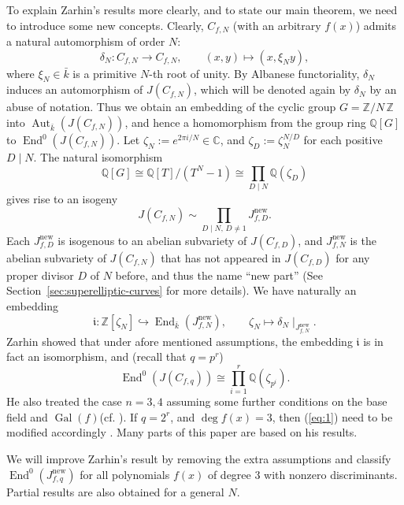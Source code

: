 \documentclass{amsart}[11pt]
\theoremstyle{definition}
\numberwithin{equation}{section}
\theoremstyle{notitle}
\begin{document}
To explain Zarhin's results more clearly, and to state our main
theorem, we need to introduce some new concepts.  Clearly, $C_{f,N}$
(with an arbitrary $f(x)$) admits a natural automorphism of order $N$:
\[ \delta_N: C_{f,N}\to C_{f,N}, \qquad (x,y)\mapsto (x,\xi_N y),\]
where $\xi_N\in \bar{k}$ is a primitive $N$-th root of unity. By
Albanese functoriality, $\delta_N$ induces an automorphism of
$J(C_{f,N})$, which will be denoted again by $\delta_N$ by an abuse of
notation.  Thus we obtain an embedding of the cyclic group
$G={\mathbb{Z}/ {N}\, \mathbb{Z}}$ into $\operatorname{Aut}_{\bar{k}}(J(C_{f,N}))$, and hence a
homomorphism from the group ring ${\mathbb{Q}}[G]$ to $\operatorname{End}^0(J(C_{f,N}))$. Let
$\zeta_N:=e^{2\pi i/N}\in {\mathbb{C}}$, and $\zeta_D:=\zeta_N^{N/D}$ for each
positive $D\mid N$. The natural isomorphism
\[ {\mathbb{Q}}[G]\cong {\mathbb{Q}}[T]/(T^N-1)\cong \prod_{D\mid N} {\mathbb{Q}}(\zeta_D)\]
gives rise to an isogeny
\begin{equation}
  \label{eq:11}
  J(C_{f,N})\sim \prod_{D\mid N,\, D\neq 1} J_{f, D}^{\mathrm{new}}. 
\end{equation}
Each $J_{f,D}^{\mathrm{new}}$ is isogenous to an abelian subvariety of
$J(C_{f,D})$, and $J_{f,N}^{\mathrm{new}}$ is the abelian subvariety of
$J(C_{f,N})$ that has not appeared in $J(C_{f,D})$ for any proper
divisor $D$ of $N$ before, and thus the name ``new part'' (See
Section~\ref{sec:superelliptic-curves} for more details). We have
naturally an embedding \[{\mathfrak{i}}:
{\mathbb{Z}}[\zeta_N]\hookrightarrow \operatorname{End}_{\bar{k}}( J_{f,N}^{\mathrm{new}}), \qquad
\zeta_N \mapsto \delta_N\mid_{J_{f,N}^{\mathrm{new}}}.\] Zarhin showed that under
afore mentioned assumptions, the embedding ${\mathfrak{i}}$ is in fact an
isomorphism, and (recall that $q=p^r$)
\begin{equation}
 \label{eq:1}
   \operatorname{End}^0(J(C_{f,q}))\cong \prod_{i=1}^r {\mathbb{Q}}(\zeta_{p^i}).    
\end{equation}
He also treated the case $n=3, 4$ assuming some further conditions on
the base field and $\operatorname{Gal}(f)$(cf. \cite[Theorem 1.3]{MR2349666}). If
$q=2^r$, and $\deg f(x)=3$, then (\ref{eq:1}) need to be modified
accordingly \cite[Theorem 1.4]{MR2349666}. Many parts of this paper
are based on his results.

We will improve Zarhin's result by removing the extra assumptions and
classify $\operatorname{End}^0(J^{\mathrm{new}}_{f,q})$ for all polynomials $f(x)$ of degree
$3$ with nonzero discriminants. Partial results are also obtained for
a general $N$.
\end{document}
